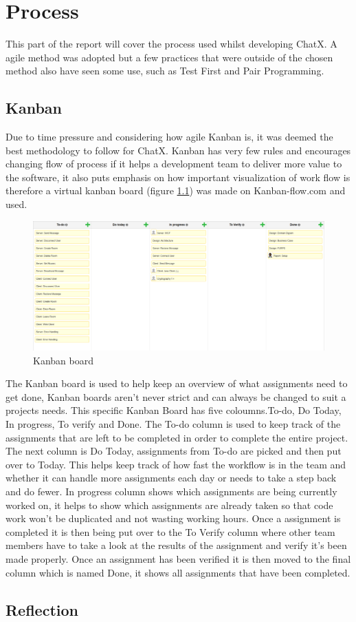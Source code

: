 \chapter{Process}
This part of the report will cover the process used whilst developing ChatX. A agile method was adopted but a few practices that were outside of the chosen method also have seen some use, such as Test First and Pair Programming.

\section{Kanban}
Due to time pressure and considering how agile Kanban is, it was deemed the best methodology to follow for ChatX. Kanban has very few rules and encourages changing flow of process if it helps a development team to deliver more value to the software, it also puts emphasis on how important visualization of work flow is therefore a virtual kanban board (figure \ref{fig:KanbanBoard})  was made on Kanban-flow.com and used. 

\begin{figure}[H]
\centering
\includegraphics[width=0.7\linewidth]{"img/Kanban Board"}
\caption{Kanban board}
\label{fig:KanbanBoard}
\end{figure}

The Kanban board is used to help keep an overview of what assignments need to get done, Kanban boards aren't never strict and can always be changed to suit a projects needs.
This specific Kanban Board has five coloumns.To-do, Do Today, In progress, To verify and Done. The To-do column is used to keep track of the assignments that are left to be completed in order to complete the entire project. The next column is Do Today, assignments from To-do are picked and then put over to Today. This helps keep track of how fast the workflow is in the team and whether it can handle more assignments each day or needs to take a step back and do fewer. In progress column shows which assignments are being currently worked on, it helps to show which assignments are already taken so that code work won't be duplicated and not wasting working hours. Once a assignment is completed it is then being put over to the To Verify column where other team members have to take a look at the results of the assignment and verify it's been made properly. Once an assignment has been verified it is then moved to the final column which is named Done, it shows all assignments that have been completed.

\section{Reflection}